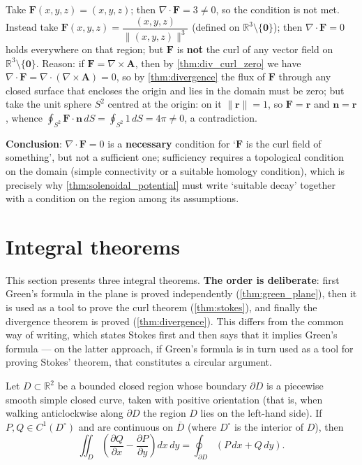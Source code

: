 \begin{example}\label{ex:solenoidal_not_curl}
Take $\mathbf F(x,y,z) = (x,y,z)$; then $\nabla\cdot\mathbf F = 3\ne0$, so the condition is not met. Instead take $\mathbf F(x,y,z)=\dfrac{(x,y,z)}{\|(x,y,z)\|^3}$ (defined on $\mathbb R^3\setminus\{\mathbf 0\}$); then $\nabla\cdot\mathbf F=0$ holds everywhere on that region; but $\mathbf F$ is \textbf{not} the curl of any vector field on $\mathbb R^3\setminus\{\mathbf 0\}$. Reason: if $\mathbf F=\nabla\times\mathbf A$, then by \cref{thm:div_curl_zero} we have $\nabla\cdot\mathbf F = \nabla\cdot(\nabla\times\mathbf A)=0$, so by \cref{thm:divergence} the flux of $\mathbf F$ through any closed surface that encloses the origin and lies in the domain must be zero; but take the unit sphere $S^2$ centred at the origin: on it $\|\mathbf r\|=1$, so $\mathbf F=\mathbf r$ and $\mathbf n=\mathbf r$, whence $\oint_{S^2}\mathbf F\cdot\mathbf n\,dS=\oint_{S^2}1\,dS=4\pi\ne0$, a contradiction.

\textbf{Conclusion}: $\nabla\cdot\mathbf F=0$ is a \textbf{necessary} condition for `$\mathbf F$ is the curl field of something', but not a sufficient one; sufficiency requires a topological condition on the domain (simple connectivity or a suitable homology condition), which is precisely why \cref{thm:solenoidal_potential} must write `suitable decay' together with a condition on the region among its assumptions.
\end{example}

\section{Integral theorems}\label{sec:integral_theorems}

This section presents three integral theorems. \textbf{The order is deliberate}: first Green's formula in the plane is proved independently (\cref{thm:green_plane}), then it is used as a tool to prove the curl theorem (\cref{thm:stokes}), and finally the divergence theorem is proved (\cref{thm:divergence}). This differs from the common way of writing, which states Stokes first and then says that it implies Green's formula --- on the latter approach, if Green's formula is in turn used as a tool for proving Stokes' theorem, that constitutes a circular argument.

\begin{theorem}\label{thm:green_plane}
Let $D \subset \mathbb{R}^2$ be a bounded closed region whose boundary $\partial D$ is a piecewise smooth simple closed curve, taken with positive orientation (that is, when walking anticlockwise along $\partial D$ the region $D$ lies on the left-hand side). If $P, Q \in C^1(D^\circ)$ and are continuous on $\overline{D}$ (where $D^\circ$ is the interior of $D$), then
\[
\iint_D \left( \frac{\partial Q}{\partial x} - \frac{\partial P}{\partial y} \right) dx\, dy = \oint_{\partial D} (P \, dx + Q \, dy).
\]
\end{theorem}

